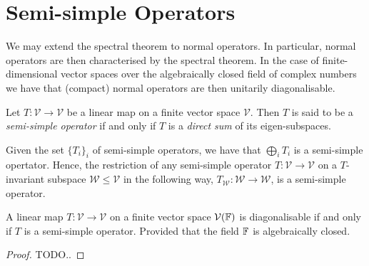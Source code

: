 
\section{Semi-simple Operators} %
\label{sec:semi-simple}

We may extend the spectral theorem to normal operators.
In particular, normal operators are then characterised
by the spectral theorem. In the case of finite-dimensional
vector spaces over the algebraically closed field of complex
numbers we have that (compact) normal operators are then
unitarily diagonalisable.

\begin{defn}
 Let $T : \mathcal{V} \to \mathcal{V}$ be a linear map on
 a finite vector space $\mathcal{V}$. Then $T$ is said to
 be a \emph{semi-simple operator} if and only if $T$ is
 a \emph{direct sum} of its eigen-subspaces.
\end{defn}

\begin{lem}
 Given the set $\{ T_i \}_i$ of semi-simple operators, we
 have that $\bigoplus_{i} T_i$ is a semi-simple opertator.
 Hence, the restriction of any semi-simple operator
 $T: \mathcal{V} \to \mathcal{V}$ on a $T$-invariant subspace
 $\mathcal{W} \leq \mathcal{V}$ in the following way,
 $T_{\mathcal{W}} : \mathcal{W} \to \mathcal{W}$, is a
 semi-simple operator.
\end{lem}

\begin{prop}
 A linear map $T : \mathcal{V} \to \mathcal{V}$ on a finite
 vector space $\mathcal{V}(\mathbb{F})$ is diagonalisable if and only
 if $T$ is a semi-simple operator. Provided that the field $\mathbb{F}$
 is algebraically closed.
\end{prop}

\begin{proof}
 TODO..
\end{proof}
